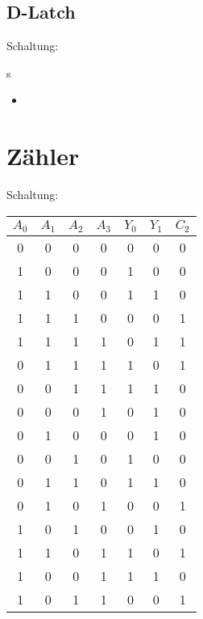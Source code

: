 \documentclass[compress,11pt]{beamer}
\begin{document}
\subsection{D-Latch}

\begin{frame}
Schaltung:\\




\end{frame}
\begin{frame}
\begin{block}{s}
\begin{itemize}
\item 
\end{itemize}
\end{block}
\end{frame}




\section{Zähler}
\begin{frame}
Schaltung:\\





\end{frame}
\begin{frame}
\begin{tabular}{|c|c|c|c||c|c|c|}
\hline 
$A_0$ & $A_1$ & $A_2$ & $A_3$ & $Y_0$ & $Y_1$ & $C_2$ \\ 
\hline 
0 & 0 & 0 & 0 & 0 & 0 & 0 \\ 
\hline 
1 & 0 & 0 & 0 & 1 & 0 & 0 \\ 
\hline 
1 & 1 & 0 & 0 & 1 & 1 & 0 \\ 
\hline 
1 & 1 & 1 & 0 & 0 & 0 & 1 \\ 
\hline 
1 & 1 & 1 & 1 & 0 & 1 & 1 \\ 
\hline 
0 & 1 & 1 & 1 & 1 & 0 & 1 \\ 
\hline 
0 & 0 & 1 & 1 & 1 & 1 & 0 \\ 
\hline 
0 & 0 & 0 & 1 & 0 & 1 & 0 \\ 
\hline 
0 & 1 & 0 & 0 & 0 & 1 & 0 \\ 
\hline 
0 & 0 & 1 & 0 & 1 & 0 & 0 \\ 
\hline 
0 & 1 & 1 & 0 & 1 & 1 & 0 \\ 
\hline 
0 & 1 & 0 & 1 & 0 & 0 & 1 \\ 
\hline 
1 & 0 & 1 & 0 & 0 & 1 & 0 \\ 
\hline 
1 & 1 & 0 & 1 & 1 & 0 & 1 \\ 
\hline 
1 & 0 & 0 & 1 & 1 & 1 & 0 \\ 
\hline 
1 & 0 & 1 & 1 & 0 & 0 & 1 \\ 
\hline 
\end{tabular}
\end{frame}
\end{document}
